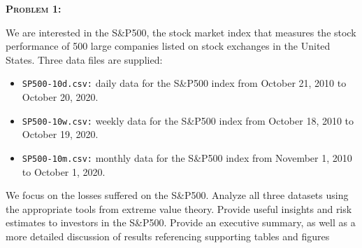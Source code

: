 \documentclass[12pt,oneside]{article}
\newenvironment{problem}[1]
{\begin{mdframed}
        \textbf{\textsc{Problem #1:}}
}
{\end{mdframed}}
\begin{document}




\begin{problem}{1}
We are interested in the S\&P500, the stock market index that measures the stock performance of 500 large companies listed on stock exchanges in the United States. Three data files are
supplied:
\begin{itemize}
    \item \texttt{SP500-10d.csv:} daily data for the S\&P500 index from October 21, 2010 to October 20, 2020.
    \item \texttt{SP500-10w.csv:} weekly data for the S\&P500 index from October 18, 2010 to October 19, 2020.
    \item \texttt{SP500-10m.csv:} monthly data for the S\&P500 index from November 1, 2010 to October 1, 2020.
\end{itemize}
We focus on the losses suffered on the S\&P500.  Analyze all three datasets using the appropriate tools from extreme value theory. Provide useful insights and risk estimates to investors in the S\&P500.
Provide an executive summary, as well as a more detailed discussion of results referencing supporting tables and figures
\end{problem}
\end{document}
